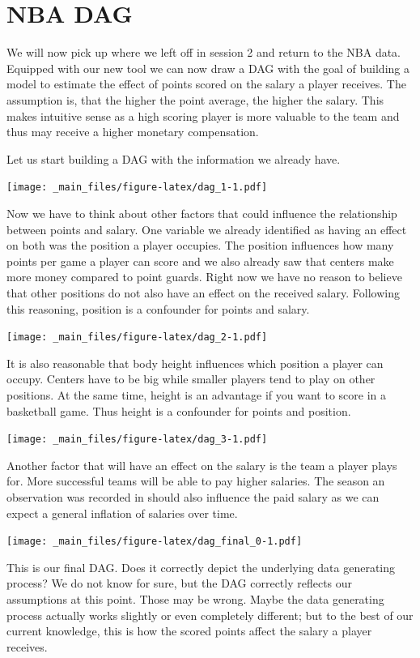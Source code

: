 \documentclass[
]{book}
\begin{document}
\hypertarget{nba-dag}{%
\section{NBA DAG}\label{nba-dag}}

We will now pick up where we left off in session 2 and return to the NBA
data. Equipped with our new tool we can now draw a DAG with the goal of
building a model to estimate the effect of points scored on the salary a
player receives. The assumption is, that the higher the point average,
the higher the salary. This makes intuitive sense as a high scoring
player is more valuable to the team and thus may receive a higher
monetary compensation.

Let us start building a DAG with the information we already have.

\texttt{[image: \_main\_files/figure-latex/dag\_1-1.pdf]}

Now we have to think about other factors that could influence the
relationship between points and salary. One variable we already
identified as having an effect on both was the position a player
occupies. The position influences how many points per game a player can
score and we also already saw that centers make more money compared to
point guards. Right now we have no reason to believe that other
positions do not also have an effect on the received salary. Following
this reasoning, position is a confounder for points and salary.

\texttt{[image: \_main\_files/figure-latex/dag\_2-1.pdf]}

It is also reasonable that body height influences which position a
player can occupy. Centers have to be big while smaller players tend to
play on other positions. At the same time, height is an advantage if you
want to score in a basketball game. Thus height is a confounder for
points and position.

\texttt{[image: \_main\_files/figure-latex/dag\_3-1.pdf]}

Another factor that will have an effect on the salary is the team a
player plays for. More successful teams will be able to pay higher
salaries. The season an observation was recorded in should also
influence the paid salary as we can expect a general inflation of
salaries over time.

\texttt{[image: \_main\_files/figure-latex/dag\_final\_0-1.pdf]}

This is our final DAG. Does it correctly depict the underlying data
generating process? We do not know for sure, but the DAG correctly
reflects our assumptions at this point. Those may be wrong. Maybe the
data generating process actually works slightly or even completely
different; but to the best of our current knowledge, this is how the
scored points affect the salary a player receives.
\end{document}
